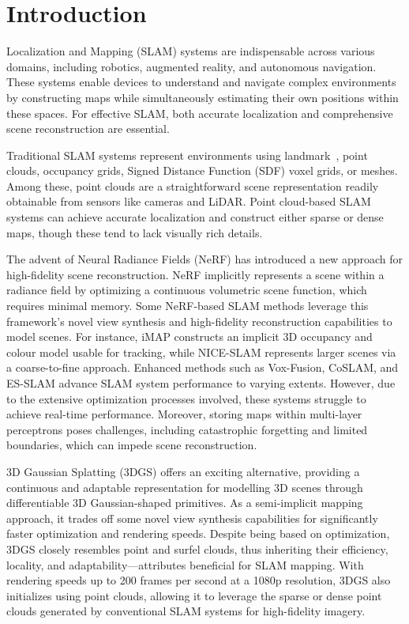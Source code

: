 \documentclass[lettersize,journal]{IEEEtran}
\begin{document}
\section{Introduction}
 Localization and Mapping (SLAM) systems are indispensable across various domains, including robotics, augmented reality, and autonomous navigation\cite{kazerouni2022survey}. These systems enable devices to understand and navigate complex environments by constructing maps while simultaneously estimating their own positions within these spaces. For effective SLAM, both accurate localization and comprehensive scene reconstruction are essential.

Traditional SLAM systems represent environments using landmark~\cite{huang2022vwr}, point clouds\cite{li2022intensity}, occupancy grids\cite{elfes1989using}, Signed Distance Function (SDF) voxel grids\cite{reijgwart2019voxgraph}, or meshes\cite{lin2023immesh}. Among these, point clouds are a straightforward scene representation readily obtainable from sensors like cameras and LiDAR. Point cloud-based SLAM systems can achieve accurate localization and construct either sparse or dense maps, though these tend to lack visually rich details.

The advent of Neural Radiance Fields (NeRF) has introduced a new approach for high-fidelity scene reconstruction\cite{mildenhall2021nerf}. NeRF implicitly represents a scene within a radiance field by optimizing a continuous volumetric scene function, which requires minimal memory. Some NeRF-based SLAM methods leverage this framework’s novel view synthesis and high-fidelity reconstruction capabilities to model scenes. For instance, iMAP\cite{imap} constructs an implicit 3D occupancy and colour model usable for tracking, while NICE-SLAM\cite{niceslam} represents larger scenes via a coarse-to-fine approach. Enhanced methods such as Vox-Fusion\cite{voxfusion}, CoSLAM\cite{coslam}, and ES-SLAM\cite{esslam} advance SLAM system performance to varying extents. However, due to the extensive optimization processes involved, these systems struggle to achieve real-time performance. Moreover, storing maps within multi-layer perceptrons poses challenges, including catastrophic forgetting and limited boundaries, which can impede scene reconstruction.

3D Gaussian Splatting (3DGS) offers an exciting alternative, providing a continuous and adaptable representation for modelling 3D scenes through differentiable 3D Gaussian-shaped primitives\cite{fei20243d}\cite{kerbl20233d}. As a semi-implicit mapping approach, it trades off some novel view synthesis capabilities for significantly faster optimization and rendering speeds. Despite being based on optimization, 3DGS closely resembles point and surfel clouds, thus inheriting their efficiency, locality, and adaptability—attributes beneficial for SLAM mapping. With rendering speeds up to 200 frames per second at a 1080p resolution, 3DGS also initializes using point clouds, allowing it to leverage the sparse or dense point clouds generated by conventional SLAM systems for high-fidelity imagery\cite{monogs}.
\end{document}
